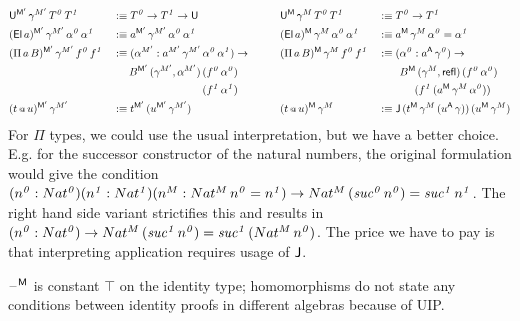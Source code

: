 \documentclass[acmsmall,review,anonymous]{acmart}\settopmatter{printfolios=true,printccs=false,printacmref=false}
\begin{document}
\begin{alignat*}{10}
  & \U^{\M'}\,\gamma^{M'}\,T^{\mathit{0}}\,T^{\mathit{1}} && :\equiv T^{\mathit{0}}\ra T^{\mathit{1}}\ra\U  && \U^\M\,\gamma^M\,T^{\mathit{0}}\,T^{\mathit{1}} && :\equiv T^{\mathit{0}}\ra T^{\mathit{1}} \\
  & (\El\,a)^{\M'}\,\gamma^{M'}\,\alpha^{\mathit{0}}\,\alpha^{\mathit{1}} && :\equiv a^{\M'}\,\gamma^{M'}\,\alpha^{\mathit{0}}\,\alpha^{\mathit{1}} && (\El\,a)^\M\,\gamma^M\,\alpha^{\mathit{0}}\,\alpha^{\mathit{1}} && :\equiv a^\M\,\gamma^M\,\alpha^{\mathit{0}} = \alpha^{\mathit{1}} \\
  & (\Pi\,a\,B)^{\M'}\,\gamma^{M'}\,f^{\mathit{0}}\,f^{\mathit{1}} && :\equiv (\alpha^{M'}:a^{M'}\,\gamma^{M'}\,\alpha^{\mathit{0}}\,\alpha^{\mathit{1}})\ra\hspace{2em}  && (\Pi\,a\,B)^\M\,\gamma^M\,f^{\mathit{0}}\,f^{\mathit{1}} && :\equiv (\alpha^{\mathit{0}}:a^\A\,\gamma^{\mathit{0}})\ra \\
  &  && \hspace{1.5em} B^{\M'}\,(\gamma^{M'}, \alpha^{M'})\,(f^{\mathit{0}}\,\alpha^{\mathit{0}}) &&  && \hspace{2em} B^\M\,(\gamma^M, \refl)\,(f^{\mathit{0}}\,\alpha^{\mathit{0}}) \\
  &  && \hspace{1.5em} \hphantom{B^{\M'}\,(\gamma^{M'}, \alpha^{M'})\,} (f^{\mathit{1}}\,\alpha^{\mathit{1}}) &&  && \hspace{3.4em}(f^{\mathit{1}}\,(a^\M\,\gamma^M\,\alpha^{\mathit{0}})) \\
  & (t\app u)^{\M'}\,\gamma^{M'} && :\equiv t^{\M'}\,(u^{\M'}\,\gamma^{M'}) && (t\app u)^\M\,\gamma^M && :\equiv \J\,(t^\M\,\gamma^M\,(u^\A\,\gamma))\,(u^\M\,\gamma^M)
\end{alignat*}
For $\Pi$ types, we could use the usual interpretation, but we have a
better choice. E.g. for the successor constructor of the natural
numbers, the original formulation would give the condition
$(n^{\mathit{0}}:Nat^{\mathit{0}})(n^{\mathit{1}}:Nat^{\mathit{1}})(n^{M}:Nat^M\,n^{\mathit{0}}
= n^{\mathit{1}})\rightarrow
Nat^M\,(\mathit{suc}^{\mathit{0}}\,n^{\mathit{0}}) =
\mathit{suc^{\mathit{1}}}\, n^{\mathit{1}}$. The right hand side
variant strictifies this and results in
$(n^{\mathit{0}}:Nat^{\mathit{0}})\rightarrow
Nat^M\,(\mathit{suc}^{\mathit{1}}\,n^{\mathit{0}}) =
\mathit{suc}^{\mathit{1}}\,(Nat^M\,n^{\mathit{0}})$. The price we have
to pay is that interpreting application requires usage of $\mathsf{J}$.

$\mathord{\hspace{1pt}\text{--}\hspace{1pt}}^{\mathsf{M}}$ is constant $\top$ on the identity type; homomorphisms
do not state any conditions between identity proofs in different
algebras because of UIP.
\end{document}
